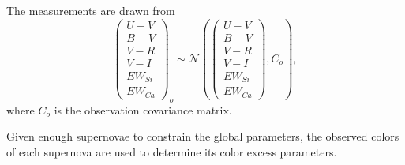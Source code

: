 \documentclass[11pt, oneside]{article}   	%
\begin{document}
The measurements are drawn from
\begin{equation}
\left(
\begin{matrix}
U-V\\B-V\\V-R\\V-I\\EW_{Si}\\ EW_{Ca}
\end{matrix}
\right)_o \sim \mathcal{N}
\left(
\left(
\begin{matrix}
U-V\\B-V\\V-R\\V-I\\EW_{Si}\\ EW_{Ca}
\end{matrix}
\right)
,C_o
\right),
\end{equation}
where $C_o$ is the observation covariance matrix.

Given enough supernovae to constrain the global parameters, the observed colors of each supernova are used to determine its
color excess parameters.
\end{document}
